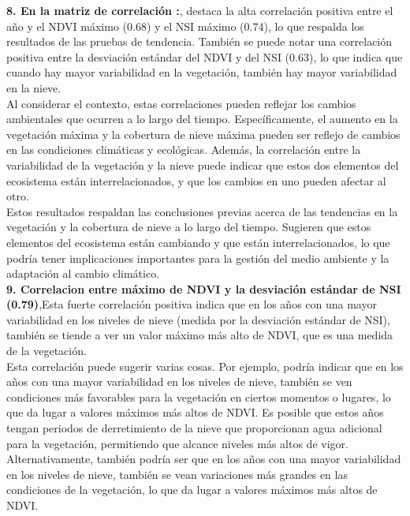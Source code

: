 {\textbf{8.	En la matriz de correlación :}, destaca la alta correlación positiva entre el año y el NDVI máximo (0.68) y el NSI máximo (0.74), lo que respalda los resultados de las pruebas de tendencia. También se puede notar una correlación positiva entre la desviación estándar del NDVI y del NSI (0.63), lo que indica que cuando hay mayor variabilidad en la vegetación, también hay mayor variabilidad en la nieve.\\

Al considerar el contexto, estas correlaciones pueden reflejar los cambios ambientales que ocurren a lo largo del tiempo. Específicamente, el aumento en la vegetación máxima y la cobertura de nieve máxima pueden ser reflejo de cambios en las condiciones climáticas y ecológicas. Además, la correlación entre la variabilidad de la vegetación y la nieve puede indicar que estos dos elementos del ecosistema están interrelacionados, y que los cambios en uno pueden afectar al otro.\\

Estos resultados respaldan las conclusiones previas acerca de las tendencias en la vegetación y la cobertura de nieve a lo largo del tiempo. Sugieren que estos elementos del ecosistema están cambiando y que están interrelacionados, lo que podría tener implicaciones importantes para la gestión del medio ambiente y la adaptación al cambio climático.\\

\textbf{9.	Correlacion entre máximo de NDVI y la desviación estándar de NSI (0.79)},Esta fuerte correlación positiva indica que en los años con una mayor variabilidad en los niveles de nieve (medida por la desviación estándar de NSI), también se tiende a ver un valor máximo más alto de NDVI, que es una medida de la vegetación.\\

Esta correlación puede sugerir varias cosas. Por ejemplo, podría indicar que en los años con una mayor variabilidad en los niveles de nieve, también se ven condiciones más favorables para la vegetación en ciertos momentos o lugares, lo que da lugar a valores máximos más altos de NDVI. Es posible que estos años tengan periodos de derretimiento de la nieve que proporcionan agua adicional para la vegetación, permitiendo que alcance niveles más altos de vigor.\\

Alternativamente, también podría ser que en los años con una mayor variabilidad en los niveles de nieve, también se vean variaciones más grandes en las condiciones de la vegetación, lo que da lugar a valores máximos más altos de NDVI.\\

}
